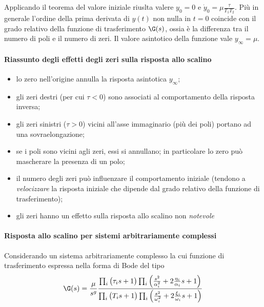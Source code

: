 		Applicando il teorema del valore iniziale riuslta valere $y_0 = 0$ e $\dot y_0 = \mu \frac \tau {T_1T_2}$. Più in generale l'ordine della prima derivata di $y(t)$ non nulla in $t=0$ coincide con il grado relativo della funzione di trasferimento $\G(s)$, ossia è la differenza tra il numero di poli e il numero di zeri. Il valore asintotico della funzione vale $y_\infty = \mu$.
		
		\paragraph{Riassunto degli effetti degli zeri sulla risposta allo scalino}
		\begin{itemize}
			\item lo zero nell'origine annulla la risposta asintotica $y_\infty$;
			\item gli zeri destri (per cui $\tau< 0 $) sono associati al comportamento della risposta inversa;
			\item gli zeri sinistri ($\tau > 0$) vicini all'asse immaginario (più dei poli) portano ad una sovraelongazione;
			\item se i poli sono vicini agli zeri, essi si annullano; in particolare lo zero può mascherare la presenza di un polo;
			\item il numero degli zeri può influenzare il comportamento iniziale (tendono a \textit{velocizzare} la risposta iniziale che dipende dal grado relativo della funzione di trasferimento);
			\item gli zeri hanno un effetto sulla risposta allo scalino non \textit{notevole}
		\end{itemize}
		
		\paragraph{Risposta allo scalino per sistemi arbitrariamente complessi}
		Considerando un sistema arbitrariamente complesso la cui funzione di trasferimento espressa nella forma di Bode del tipo
		\[  \G(s) = \frac \mu {s^g} \frac{\prod_i \big( \tau_i s + 1 \big) \prod_i \left(\frac{s^2}{\alpha_i^2}  + 2\frac {\eta_i}{\alpha_i} s + 1 	\right) }{ \prod_i \big( T_i s + 1 \big) \prod_i \left(\frac{s^2}{\omega_i^2}  + 2\frac {\xi_i}{\omega_i} s + 1 \right) } \]
		
